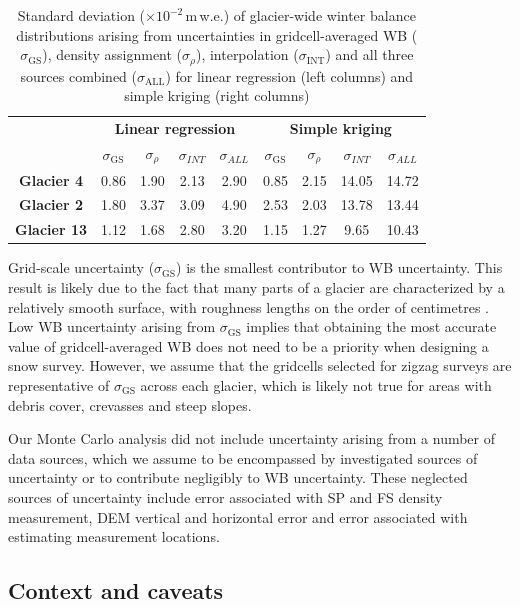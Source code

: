 \documentclass[twocolumn, letterpaper]{igs}
\begin{document}
 \begin{table}[]
\centering
\caption{Standard deviation ($\times10^{-2}$\,m\,w.e.) of glacier-wide winter balance distributions arising from uncertainties in gridcell-averaged WB ($\sigma_{\mathrm{GS}}$), density assignment ($\sigma_{\rho}$), interpolation ($\sigma_{\mathrm{INT}}$) and all three sources combined ($\sigma_{\mathrm{ALL}}$) for linear regression (left columns) and simple kriging (right columns)}
\label{tab:WSMBdistribution_sigma}
\begin{tabular}{c|cccc|cccc}
 & \multicolumn{4}{c|}{\textbf{Linear regression}} & \multicolumn{4}{c}{\textbf{Simple kriging}} \\
\textbf{} & $\sigma_{\mathrm{GS}}$ & $\sigma_{\rho}$ & $\sigma_{INT}$ & $\sigma_{ALL}$ & $\sigma_{\mathrm{GS}}$ & $\sigma_{\rho}$ & $\sigma_{INT}$ & $\sigma_{ALL}$ \\ \hline
\textbf{Glacier 4} & 0.86 & 1.90 & 2.13 & 2.90 & 0.85 & 2.15 & 14.05 & 14.72 \\
\textbf{Glacier 2} & 1.80 & 3.37 & 3.09 & 4.90 & 2.53 & 2.03 & 13.78 & 13.44 \\
\textbf{Glacier 13} & 1.12 & 1.68 & 2.80 & 3.20 & 1.15 & 1.27 & 9.65 & 10.43
\end{tabular}
\end{table}

Grid-scale uncertainty ($\sigma_{\mathrm{GS}}$) is the smallest contributor to WB uncertainty. This result is likely due to the fact that many parts of a glacier are characterized by a relatively smooth surface, with roughness lengths on the order of centimetres \citep[e.g.][]{Hock2005}. Low WB uncertainty arising from $\sigma_{\mathrm{GS}}$ implies that obtaining the most accurate value of gridcell-averaged WB does not need to be a priority when designing a snow survey. However, we assume that the gridcells selected for zigzag surveys are representative of $\sigma_{\mathrm{GS}}$ across each glacier, which is likely not true for areas with debris cover, crevasses and steep slopes.

Our Monte Carlo analysis did not include uncertainty arising from a number of data sources, which we assume to be encompassed by investigated sources of uncertainty or to contribute negligibly to WB uncertainty. These neglected sources of uncertainty include error associated with SP and FS density measurement, DEM vertical and horizontal error and error associated with estimating measurement locations.


\subsection{Context and caveats}
\end{document}

